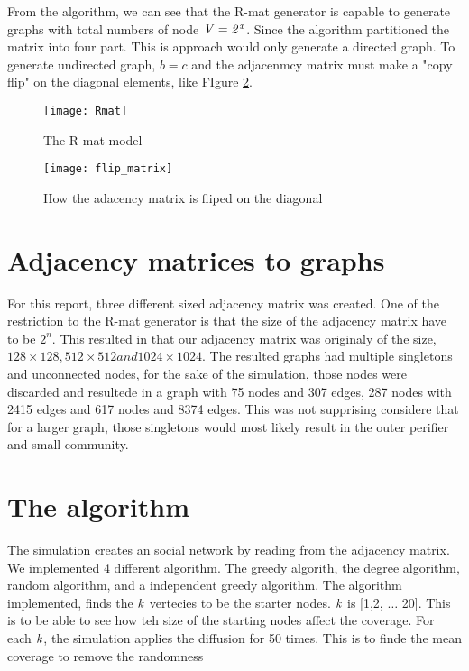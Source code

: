 From the algorithm, we can see that the R-mat generator is capable to generate graphs with total numbers of node $ \it{V} = 2^x$. Since the algorithm partitioned the matrix into four part. This is approach would only generate a directed graph. To generate undirected graph, $b = c$ and the adjacenmcy matrix must make a "copy flip" on the diagonal elements, like FIgure \ref{fig:flipDiagonal}. 

\begin{figure}
\texttt{[image: Rmat]}
\caption{The R-mat model}
\label{fig:Rmat}
\end{figure}

\begin{figure}
\texttt{[image: flip\_matrix]}
\caption{How the adacency matrix is fliped on the diagonal}
\label{fig:flipDiagonal}

\end{figure}


\section{Adjacency matrices to graphs}
For this report, three different sized adjacency matrix was created. One of the restriction to the R-mat generator is that the size of the adjacency matrix have to be $2^n$. This resulted in that our adjacency matrix was originaly of the size, $128 \times 128, 512 \times 512 and 1024 \times 1024$. The resulted graphs had multiple singletons and unconnected nodes, for the sake of the simulation, those nodes were discarded and resultede in a graph with 75 nodes and 307 edges, 287 nodes with 2415 edges and 617 nodes and 8374 edges. This was not supprising considere that for a larger graph, those singletons would most likely result in the outer perifier and small community.

\section{The algorithm}
The simulation creates an social network by reading from the adjacency matrix. We implemented 4 different algorithm. The greedy algorith, the degree algorithm, random algorithm, and a independent greedy algorithm. The algorithm implemented, finds the $\it{k}$ vertecies to be the starter nodes. $\it{k}$ is [1,2,  $\dots$ 20]. This is to be able to see how teh size of the starting nodes affect the coverage. For each $\it{k}$, the simulation applies the diffusion for 50 times. This is to finde the mean coverage to remove the randomness 

